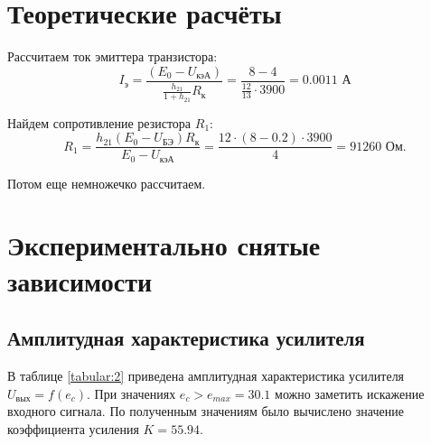 \section{Теоретические расчёты}

Рассчитаем ток эмиттера транзистора: 
\begin{equation}
I_\text{э} = \frac{(E_0 - U_\text{кэА})}{\frac{h_{21}}{1+h_{21}}R_\text{к}} = \frac{8 - 4}{\frac{12}{13} \cdot 3900} = 0.0011 \text{ А}
\end{equation}

Найдем сопротивление резистора $R_1$:
\begin{equation}
R_1 = \frac{h_{21}(E_0-U_\text{БЭ})R_\text{к}}{E_0-U_\text{кэА}} = \frac{12 \cdot (8 - 0.2) \cdot 3900}{4} = 91260 \text{ Ом}.
\end{equation}

Потом еще немножечко рассчитаем.

\section{Экспериментально снятые зависимости}

\subsection{Амплитудная характеристика усилителя}

В таблице \ref{tabular:2} приведена амплитудная характеристика усилителя\\ $U_\text{вых} = f(e_c)$. При значениях $e_c > e_{max} = 30.1$ можно заметить искажение входного сигнала. По полученным значениям было вычислено значение коэффициента усиления $K = 55.94$.

